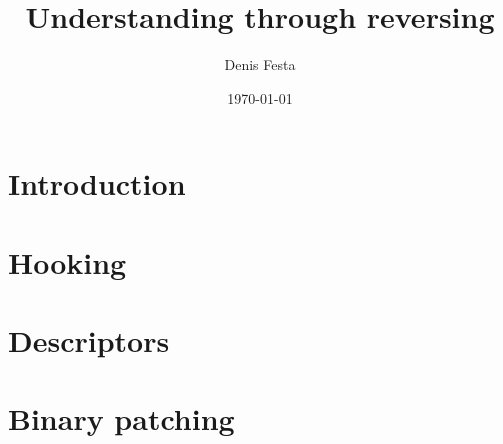 \documentclass[10pt,twocolumn,a4paper]{article}
\begin{document}
\title{Understanding through reversing}
\author{Denis Festa}
\date{\today}

\maketitle

\tableofcontents

\section{Introduction}
%
%
%
%
%
%
\section{Hooking}
\label{sec:hooking}


\section{Descriptors}



\section{Binary patching}


\end{document}
